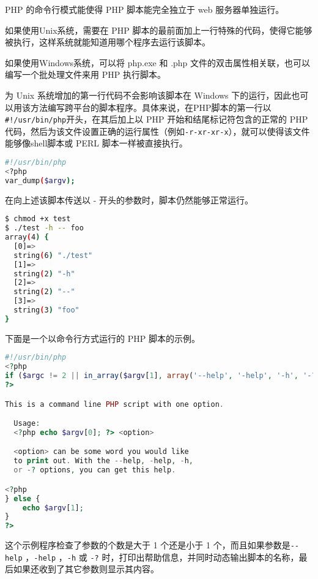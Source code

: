 PHP 的命令行模式能使得 PHP 脚本能完全独立于 web 服务器单独运行。

\begin{compactitem}
\item 如果使用Unix系统，需要在 PHP 脚本的最前面加上一行特殊的代码，使得它能够被执行，这样系统就能知道用哪个程序去运行该脚本。
\item 如果使用Windows系统，可以将 php.exe 和 .php 文件的双击属性相关联，也可以编写一个批处理文件来用 PHP 执行脚本。
\end{compactitem}

为 Unix 系统增加的第一行代码不会影响该脚本在 Windows 下的运行，因此也可以用该方法编写跨平台的脚本程序。具体来说，在PHP脚本的第一行以\texttt{\#!/usr/bin/php}开头，在其后加上以 PHP 开始和结尾标记符包含的正常的 PHP 代码，然后为该文件设置正确的运行属性（例如\texttt{-r-xr-xr-x}），就可以使得该文件能够像shell脚本或 PERL 脚本一样被直接执行。

\begin{lstlisting}[language=bash]
#!/usr/bin/php
<?php
var_dump($argv);
\end{lstlisting}

在向上述该脚本传送以 - 开头的参数时，脚本仍然能够正常运行。


\begin{lstlisting}[language=bash]
$ chmod +x test
$ ./test -h -- foo
array(4) {
  [0]=>
  string(6) "./test"
  [1]=>
  string(2) "-h"
  [2]=>
  string(2) "--"
  [3]=>
  string(3) "foo"
}
\end{lstlisting}


下面是一个以命令行方式运行的 PHP 脚本的示例。

\begin{lstlisting}[language=PHP]
#!/usr/bin/php
<?php
if ($argc != 2 || in_array($argv[1], array('--help', '-help', '-h', '-?'))) {
?>

This is a command line PHP script with one option.

  Usage:
  <?php echo $argv[0]; ?> <option>

  <option> can be some word you would like
  to print out. With the --help, -help, -h,
  or -? options, you can get this help.

<?php
} else {
    echo $argv[1];
}
?>
\end{lstlisting}

这个示例程序检查了参数的个数是大于 1 个还是小于 1 个，而且如果参数是\texttt{-\/-help} ，\texttt{-help} ，\texttt{-h} 或 \texttt{-?} 时，打印出帮助信息，并同时动态输出脚本的名称，最后如果还收到了其它参数则显示其内容。

